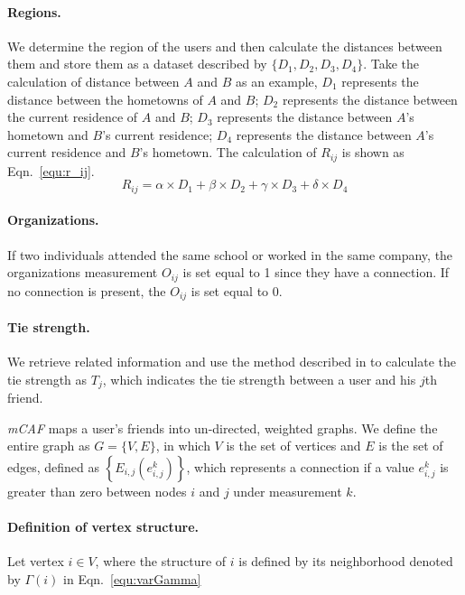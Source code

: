 \documentclass{mcmthesis}
\begin{document}
\paragraph{Regions.} We determine the region of the users and then calculate the distances between them and store them as a dataset described by $\{D_1, D_2, D_3, D_4\}$. Take the calculation of distance between $A$ and $B$ as an example, $D_1$ represents the distance between the hometowns of $A$ and $B$; $D_2$ represents the distance between the current residence of $A$ and $B$; $D_3$ represents the distance between $A$'s hometown and $B$'s current residence; $D_4$ represents the distance between $A$'s current residence and $B$'s hometown. The calculation of $R_{ij}$ is shown as Eqn.~\eqref{equ:r_ij}.
\begin{equation}\label{equ:r_ij}
R_{ij}=\alpha \times D_1 + \beta\times D_2+\gamma\times D_3+\delta\times D_4
\end{equation} 

\paragraph{Organizations.} If two individuals attended the same school or worked in the same company, the organizations measurement $O_{ij}$ is set equal to 1 since they have a connection. If no connection is present, the $O_{ij}$ is set equal to 0.

\paragraph{Tie strength.} 
We retrieve related information and use the method described in \cite{treeit2014tsai} to calculate the tie strength as $T_j$, which indicates the tie strength between a user and his $j$th friend.

\emph{mCAF} maps a user's friends into un-directed, weighted graphs. We define the entire graph as $G=\{V,E\}$, in which $V$ is the set of vertices and $E$ is the set of edges, defined as $\left\{E_{i,j}(e_{i,j}^k)\right\}$, which represents a connection if a value $e_{i,j}^k$ is greater than zero between nodes $i$ and $j$ under measurement $k$.

\paragraph{Definition of vertex structure.} Let vertex $i\in V$, where the structure of $i$ is defined by its neighborhood denoted by $\varGamma(i)$ in Eqn.~\eqref{equ:varGamma}
\end{document}
